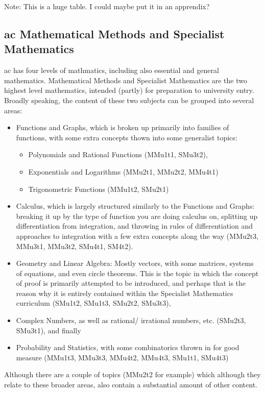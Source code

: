 \documentclass[twoside,12pt,a4paper]{report}
\begin{document}
Note: This is a huge table. I could maybe put it in an apprendix?




\subsection{\gls{ac} Mathematical Methods and Specialist Mathematics}

 \gls{ac} has four levels of mathmatics, including also essential and general mathematics. Mathematical Methods and Specialist Mathematics are the two highest level mathematics, intended (partly) for preparation to university entry. Broadly speaking, the content of these two subjects can be grouped into several areas:
\begin{itemize}
	\item Functions and Graphs, which is broken up primarily into families of functions, with some extra concepts thown into some generalist topics:
		\begin{itemize}	
			\item Polynomials and Rational Functions (MMu1t1, SMu3t2),
			\item Exponentials and Logarithms (MMu2t1, MMu2t2, MMu4t1)
			\item Trigonometric Functions (MMu1t2, SMu2t1)
		\end{itemize}
	\item Calculus, which is largely structured similarly to the Functions and Graphs: breaking it up by the type of function you are doing calculus on, splitting up differentiation from integration, and throwing in rules of differentiation and approaches to integration with a few extra concepts along the way (MMu2t3, MMu3t1, MMu3t2, SMu4t1, SM4t2).
	\item Geometry and Linear Algebra: Mostly vectors, with some matrices, systems of equations, and even circle theorems. This is the topic in which the concept of proof is primarily attempted to be introduced, and perhaps that is the reason why it is entirely contained within the Specialist Mathematics curriculum (SMu1t2, SMu1t3, SMu2t2, SMu3t3),
	\item Complex Numbers, as well as rational/ irrational numbers, etc. (SMu2t3, SMu3t1), and finally
	\item Probability and Statistics, with some combinatorics thrown in for good measure (MMu1t3, MMu3t3, MMu4t2, MMu4t3, SMu1t1, SMu4t3)
\end{itemize}
Although there are a couple of topics (MMu2t2 for example) which although they relate to these broader areas, also contain a substantial amount of other content.
\end{document}
